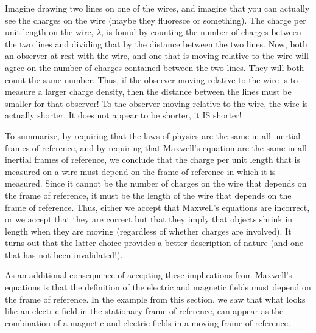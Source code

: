 Imagine drawing two lines on one of the wires, and imagine that you can actually see the  charges on the wire (maybe they fluoresce or something). The charge per unit length on the wire, $\lambda$, is found by counting the number of charges between the two lines and dividing that by the distance between the two lines. Now, both an observer at rest with the wire, and one that is moving relative to the wire will agree on the number of charges contained between the two lines. They will both count the same number. Thus, if the observer moving relative to the wire is to measure a larger charge density, then the distance between the lines must be smaller for that observer! To the observer moving relative to the wire, the wire is actually shorter. It does not appear to be shorter, it IS shorter!

To summarize, by requiring that the laws of physics are the same in all inertial frames of reference, and by requiring that Maxwell's equation are the same in all inertial frames of reference, we conclude that the charge per unit length that is measured on a wire must depend on the frame of reference in which it is measured. Since it cannot be the number of charges on the wire that depends on the frame of reference, it must be the length of the wire that depends on the frame of reference. Thus, either we accept that Maxwell's equations are incorrect, or we accept that they are correct but that they imply that objects shrink in length when they are moving (regardless of whether charges are involved). It turns out that the latter choice provides a better description of nature (and one that has not been invalidated!). 

As an additional consequence of accepting these implications from Maxwell's equations is that the definition of the electric and magnetic fields must depend on the frame of reference. In the example from this section, we saw that what looks like an electric field in the stationary frame of reference, can appear as the combination of a magnetic and electric fields in a moving frame of reference.

